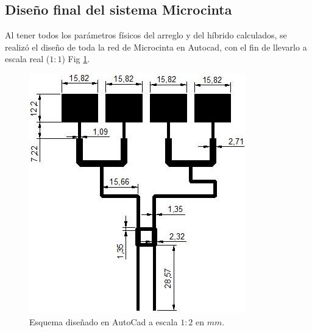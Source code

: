 \documentclass[twocolumn]{IEEEtran}
\begin{document}
\subsection{Diseño final del sistema Microcinta}
\noindent
Al tener todos los parámetros físicos del arreglo y del híbrido calculados, se realizó el diseño de toda la red de Microcinta en Autocad, con el fin de llevarlo a escala real ($1:1$) Fig \ref{fig5}.
\begin{figure}[H]
	\centering
		\includegraphics[scale=0.5]{esquema.jpg}
	\caption{Esquema diseñado en AutoCad a escala $1:2$ en $mm$.}
	\label{fig5}
\end{figure}
\end{document}
